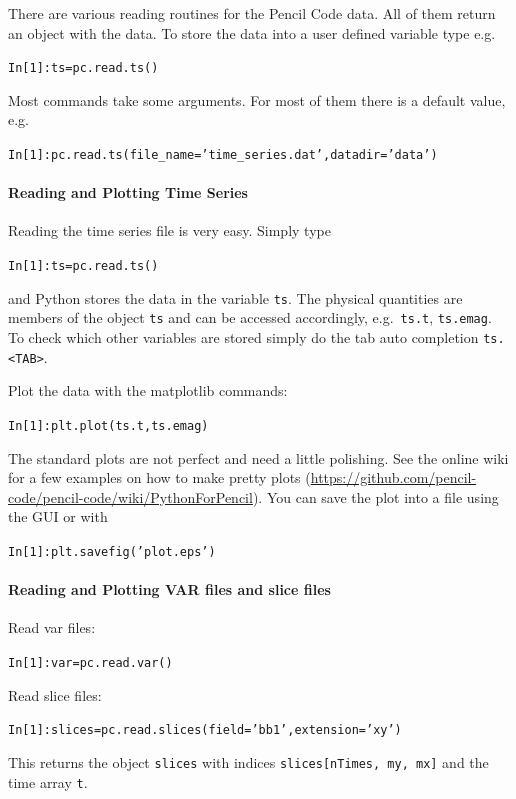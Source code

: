 \documentclass[\mydriver,12pt,twoside,notitlepage,a4paper]{article}
\begin{document}
There are various reading routines for the Pencil Code data.
All of them return an object with the data.
To store the data into a user defined variable type e.g.
\begin{alltt}
In [1]: ts = pc.read.ts()
\end{alltt}

Most commands take some arguments.
For most of them there is a default value, e.g.
\begin{alltt}
In [1]: pc.read.ts(file_name='time_series.dat', datadir='data')
\end{alltt}

\paragraph{Reading and Plotting Time Series}
Reading the time series file is very easy.
Simply type
\begin{alltt}
In [1]: ts = pc.read.ts()
\end{alltt}
and Python stores the data in the variable \texttt{ts}.
The physical quantities are members of the object \texttt{ts} and can be accessed
accordingly, e.g.\ \texttt{ts.t}, \texttt{ts.emag}.
To check which other variables are stored simply do the tab auto completion \texttt{ts. <TAB>}.

Plot the data with the matplotlib commands:
\begin{alltt}
In [1]: plt.plot(ts.t, ts.emag)
\end{alltt}
The standard plots are not perfect and need a little polishing.
See the online wiki for a few examples on how to make pretty plots
(\url{https://github.com/pencil-code/pencil-code/wiki/PythonForPencil}).
You can save the plot into a file using the GUI or with
\begin{alltt}
In [1]: plt.savefig('plot.eps')
\end{alltt}

\paragraph{Reading and Plotting VAR files and slice files}
Read var files:
\begin{alltt}
In [1]: var = pc.read.var()
\end{alltt}
Read slice files:
\begin{alltt}
In [1]: slices = pc.read.slices(field='bb1', extension='xy')
\end{alltt}
This returns the object \texttt{slices} with indices \texttt{slices[nTimes, my, mx]}
and the time array \texttt{t}.
\end{document}

